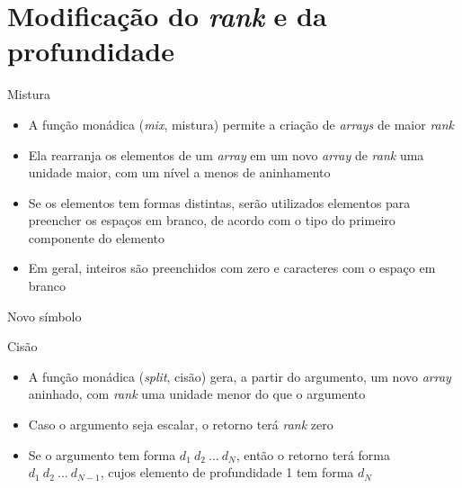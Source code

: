 \section{Modificação do {\it rank} e da profundidade}

\begin{frame}[fragile]{Mistura}

    \begin{itemize}
        \item A função monádica  (\textit{mix}, mistura) permite a criação de 
            \textit{arrays} de maior \textit{rank}
        \pause

        \item Ela rearranja os elementos de um \textit{array} em um novo \textit{array} de 
            \textit{rank} uma unidade maior, com um nível a menos de aninhamento
        \pause

        \item Se os elementos tem formas distintas, serão utilizados elementos para preencher os
            espaços em branco, de acordo com o tipo do primeiro componente do elemento
        \pause

        \item Em geral, inteiros são preenchidos com zero e caracteres com o espaço em branco
    \end{itemize}

\end{frame}

\begin{frame}[fragile]{Novo símbolo}


\end{frame}

\begin{frame}[fragile]{Cisão}

    \begin{itemize}
        \item A função monádica  (\textit{split}, cisão) gera, a partir do argumento,
            um novo \textit{array} aninhado, com \textit{rank} uma unidade menor do que o argumento 
        \pause

        \item Caso o argumento seja escalar, o retorno terá \textit{rank} zero
        \pause

        \item Se o argumento tem forma $d_1\ d_2\ \ldots\ d_N$, então o retorno terá forma
            $d_1\ d_2\ \ldots\ d_{N-1}$, cujos elemento de profundidade 1 tem forma $d_N$
    \end{itemize}

\end{frame}

